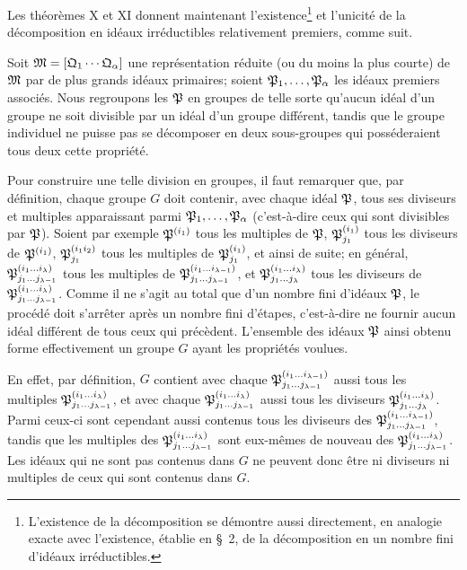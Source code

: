 Les théorèmes X et XI donnent maintenant l'existence\footnote{L'existence de la décomposition se démontre aussi directement, en analogie exacte avec l'existence, établie en \S~2, de la décomposition en un nombre fini d'idéaux irréductibles.} et l'unicité de la décomposition en idéaux irréductibles relativement premiers, comme suit.

Soit $\mathfrak{M}=[\mathfrak{Q}_1\cdots\mathfrak{Q}_\alpha]$ une représentation réduite (ou du moins la plus courte) de $\mathfrak{M}$ par de plus grands idéaux primaires; soient $\mathfrak{P}_1,\ldots,\mathfrak{P}_\alpha$ les idéaux premiers associés. Nous regroupons les $\mathfrak{P}$ en groupes de telle sorte qu'aucun idéal d'un groupe ne soit divisible par un idéal d'un groupe différent, tandis que le groupe individuel ne puisse pas se décomposer en deux sous-groupes qui posséderaient tous deux cette propriété.

Pour construire une telle division en groupes, il faut remarquer que, par définition, chaque groupe $G$ doit contenir, avec chaque idéal $\mathfrak{P}$, tous ses diviseurs et multiples apparaissant parmi $\mathfrak{P}_1,\ldots,\mathfrak{P}_\alpha$ (c'est-à-dire ceux qui sont divisibles par $\mathfrak{P}$). Soient par exemple $\mathfrak{P}^{(i_1)}$ tous les multiples de $\mathfrak{P}$, $\mathfrak{P}_{j_1}^{(i_1)}$ tous les diviseurs de $\mathfrak{P}^{(i_1)}$, $\mathfrak{P}_{j_1}^{(i_1i_2)}$ tous les multiples de $\mathfrak{P}_{j_1}^{(i_1)}$, et ainsi de suite; en général, $\mathfrak{P}_{j_1\ldots j_{\lambda-1}}^{(i_1\ldots i_\lambda)}$ tous les multiples de $\mathfrak{P}_{j_1\ldots j_{\lambda-1}}^{(i_1\ldots i_{\lambda-1})}$, et $\mathfrak{P}_{j_1\ldots j_\lambda}^{(i_1\ldots i_\lambda)}$ tous les diviseurs de $\mathfrak{P}_{j_1\ldots j_{\lambda-1}}^{(i_1\ldots i_\lambda)}$. Comme il ne s'agit au total que d'un nombre fini d'idéaux $\mathfrak{P}$, le procédé doit s'arrêter après un nombre fini d'étapes, c'est-à-dire ne fournir aucun idéal différent de tous ceux qui précèdent. L'ensemble des idéaux $\mathfrak{P}$ ainsi obtenu forme effectivement un groupe $G$ ayant les propriétés voulues.

En effet, par définition, $G$ contient avec chaque $\mathfrak{P}_{j_1\ldots j_{\lambda-1}}^{(i_1\ldots i_{\lambda-1})}$ aussi tous les multiples $\mathfrak{P}_{j_1\ldots j_{\lambda-1}}^{(i_1\ldots i_\lambda)}$, et avec chaque $\mathfrak{P}_{j_1\ldots j_{\lambda-1}}^{(i_1\ldots i_\lambda)}$ aussi tous les diviseurs $\mathfrak{P}_{j_1\ldots j_\lambda}^{(i_1\ldots i_\lambda)}$. Parmi ceux-ci sont cependant aussi contenus tous les diviseurs des $\mathfrak{P}_{j_1\ldots j_{\lambda-1}}^{(i_1\ldots i_{\lambda-1})}$, tandis que les multiples des $\mathfrak{P}_{j_1\ldots j_{\lambda-1}}^{(i_1\ldots i_\lambda)}$ sont eux-mêmes de nouveau des $\mathfrak{P}_{j_1\ldots j_{\lambda-1}}^{(i_1\ldots i_\lambda)}$. Les idéaux qui ne sont pas contenus dans $G$ ne peuvent donc être ni diviseurs ni multiples de ceux qui sont contenus dans $G$.

